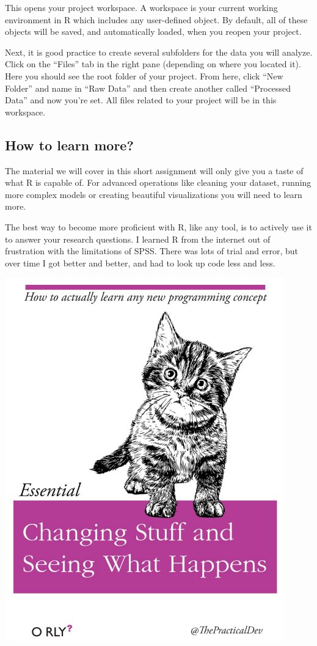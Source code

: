 \documentclass[
]{html}
\theoremstyle{definition}
\theoremstyle{definition}
\theoremstyle{definition}
\theoremstyle{definition}
\theoremstyle{remark}
\begin{document}
This opens your project workspace. A workspace is your current working environment in R which includes any user-defined object. By default, all of these objects will be saved, and automatically loaded, when you reopen your project.

Next, it is good practice to create several subfolders for the data you will analyze. Click on the ``Files'' tab in the right pane (depending on where you located it). Here you should see the root folder of your project. From here, click ``New Folder'' and name in ``Raw Data'' and then create another called ``Processed Data'' and now you're set. All files related to your project will be in this workspace.

\hypertarget{how-to-learn-more}{%
\subsection{How to learn more?}\label{how-to-learn-more}}

The material we will cover in this short assignment will only give you a taste of what R is capable of. For advanced operations like cleaning your dataset, running more complex models or creating beautiful visualizations you will need to learn more.

The best way to become more proficient with R, like any tool, is to actively use it to answer your research questions. I learned R from the internet out of frustration with the limitations of SPSS. There was lots of trial and error, but over time I got better and better, and had to look up code less and less.

\includegraphics{images/clipboard-553228617.png}
\end{document}

